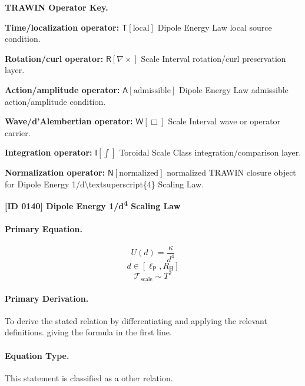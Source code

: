 \par\vspace{0.45\baselineskip}
\noindent\begin{minipage}[t]{\linewidth}
\begingroup
\small
\raggedright
\textbf{TRAWIN Operator Key.}\par
\noindent\textbf{Time/localization operator:} $\mathsf{T}\!\left[\mathrm{local}\right]$ Dipole Energy Law local source condition.\par
\noindent\textbf{Rotation/curl operator:} $\mathsf{R}\!\left[\nabla\times\right]$ Scale Interval rotation/curl preservation layer.\par
\noindent\textbf{Action/amplitude operator:} $\mathsf{A}\!\left[\mathrm{admissible}\right]$ Dipole Energy Law admissible action/amplitude condition.\par
\noindent\textbf{Wave/d'Alembertian operator:} $\mathsf{W}\!\left[\Box\right]$ Scale Interval wave or operator carrier.\par
\noindent\textbf{Integration operator:} $\mathsf{I}\!\left[\int\right]$ Toroidal Scale Class integration/comparison layer.\par
\noindent\textbf{Normalization operator:} $\mathsf{N}\!\left[\mathrm{normalized}\right]$ normalized TRAWIN closure object for Dipole Energy 1/d\textbackslash{}textsuperscript\{4\} Scaling Law.\par
\endgroup
\end{minipage}

\clearpage
\noindent\textbf{[ID 0140] Dipole Energy 1/d\textsuperscript{4} Scaling Law}\par
\vspace{0.35em}
\paragraph{Primary Equation.}
\[
U(d)=\frac{\kappa}{d^4}
\]
\[
d\in [\ell_{\mathrm{P}},R_{\mathrm{H}}]
\]
\[
\mathcal{T}_{\mathrm{scale}}\sim T^2
\]

\paragraph{Primary Derivation.}
To derive the stated relation by differentiating and applying the relevant definitions. giving the formula in the first line.
\paragraph{Equation Type.}
This statement is classified as a other relation.

